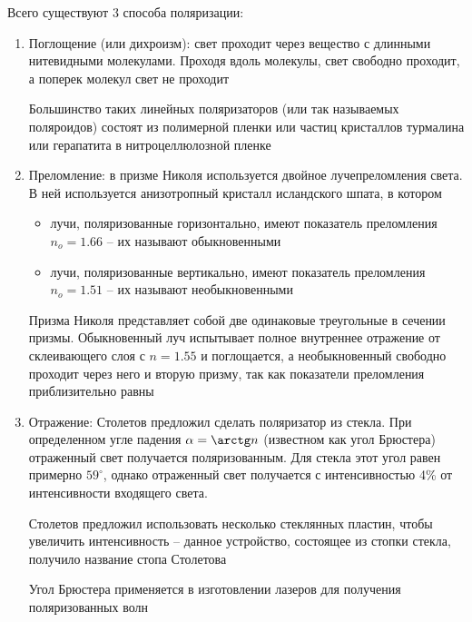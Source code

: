 \documentclass[12pt]{article}
\begin{document}
Всего существуют 3 способа поляризации:

\begin{enumerate}
    \item Поглощение (или дихроизм): свет проходит через вещество с длинными нитевидными молекулами. Проходя вдоль молекулы, свет свободно проходит, а поперек молекул свет не проходит

    Большинство таких линейных поляризаторов (или так называемых поляроидов) состоят из полимерной пленки или частиц кристаллов турмалина или герапатита в нитроцеллюлозной пленке

    \item Преломление: в призме Николя используется двойное лучепреломления света. В ней используется анизотропный кристалл исландского шпата, в котором

    \begin{itemize}
        \item лучи, поляризованные горизонтально, имеют показатель преломления $n_o = 1.66$ -- их называют обыкновенными
        \item лучи, поляризованные вертикально, имеют показатель преломления $n_o = 1.51$ -- их называют необыкновенными
    \end{itemize}

    Призма Николя представляет собой две одинаковые треугольные в сечении призмы. Обыкновенный луч испытывает полное внутреннее отражение от склеивающего слоя с $n = 1.55$ и поглощается, а необыкновенный свободно проходит через него и вторую призму, так как показатели преломления приблизительно равны


    \item Отражение: Столетов предложил сделать поляризатор из стекла. При определенном угле падения $\alpha = \arctg n$ (известном как угол Брюстера) отраженный свет получается поляризованным. Для стекла этот угол равен примерно $59^{\circ}$, однако отраженный свет получается с интенсивностью 4\% от интенсивности входящего света.

    Столетов предложил использовать несколько стеклянных пластин, чтобы увеличить интенсивность -- данное устройство, состоящее из стопки стекла, получило название стопа Столетова

    Угол Брюстера применяется в изготовлении лазеров для получения поляризованных волн 

\end{enumerate}
\end{document}
